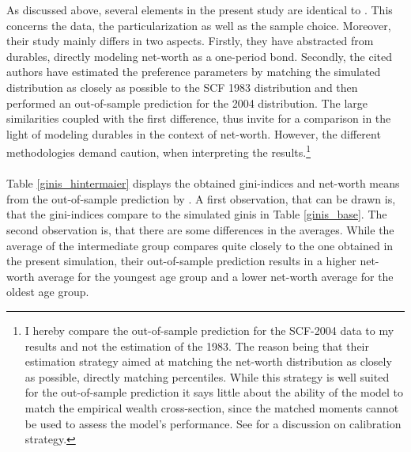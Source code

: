 \documentclass[12pt,a4paper,leqno]{article}
\theoremstyle{definition}
\begin{document}
As discussed above, several elements in the present study are identical to \cite{hintermaier2011}. This concerns the data, the particularization as well as the sample choice. Moreover, their study mainly differs in two aspects. Firstly, they have abstracted from durables, directly modeling net-worth as a one-period bond. Secondly, the cited authors have estimated the preference parameters by matching the simulated distribution as closely as possible to the SCF 1983 distribution and then performed an out-of-sample prediction for the 2004 distribution. The large similarities coupled with the first difference, thus invite for a comparison in the light of modeling durables in the context of net-worth. However, the different methodologies demand caution, when interpreting the results.\footnote{I hereby compare the out-of-sample prediction for the SCF-2004 data to my results and not the estimation of the 1983. The reason being that their estimation strategy aimed at matching the net-worth distribution as closely as possible, directly matching percentiles. While this strategy is well suited for the out-of-sample prediction it says little about the ability of the model to match the empirical wealth cross-section, since the matched moments cannot be used to assess the model's performance. See \cite{kydland1996computational} for a discussion on calibration strategy.} \\
\\ Table \ref{ginis_hintermaier}
displays the obtained gini-indices and net-worth means from the out-of-sample prediction by \cite{hintermaier2011}. A first observation, that can be drawn is, that the gini-indices compare to the simulated ginis in Table \ref{ginis_base}. The second observation is, that there are some differences in the averages. While the average of the intermediate group compares quite closely to the one obtained in the present simulation, their out-of-sample prediction results in a higher net-worth average for the youngest age group and a lower net-worth average for the oldest age group.\\ 
\end{document}
